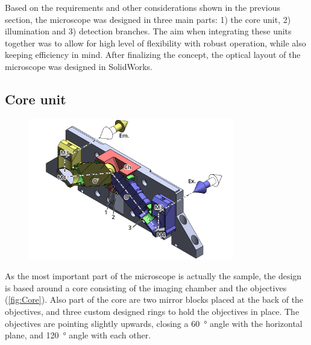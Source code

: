   Based on the requirements and other considerations shown in the previous section, the microscope was designed in three main parts: 1) the core unit, 2) illumination and 3) detection branches. The aim when integrating these units together was to allow for high level of flexibility with robust operation, while also keeping efficiency in mind. After finalizing the concept, the optical layout of the microscope was designed in SolidWorks.



  \subsection{Core unit}
  \label{sec:core}
    \begin{figure}
      \centering
      \includegraphics[width=0.8\textwidth]{SW/frontRender.png}
      \label{fig:Core}
    \end{figure}

    As the most important part of the microscope is actually the sample, the design is based around a core consisting of the imaging chamber and the objectives (\autoref{fig:Core}). Also part of the core are two mirror blocks placed at the back of the objectives, and three custom designed rings to hold the objectives in place. The objectives are pointing slightly upwards, closing a \SI{60}{\degree} angle with the horizontal plane, and \SI{120}{\degree} angle with each other. 


